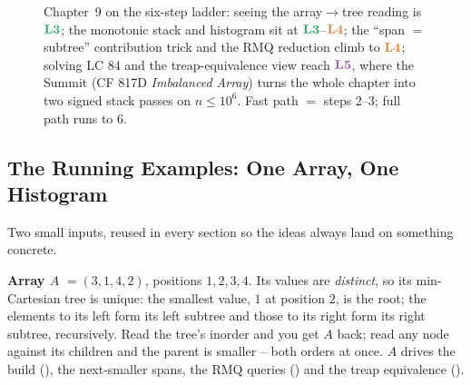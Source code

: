 \begin{figure}[H]
\centering
{}
\caption*{Chapter~9 on the six-step ladder: seeing the array$\to$tree reading is $\lv3$; the monotonic
stack and histogram sit at $\lv3$--$\lv4$; the ``span $=$ subtree'' contribution trick and the RMQ
reduction climb to $\lv4$; solving LC 84 and the treap-equivalence view reach $\lv5$, where the Summit
(CF 817D \emph{Imbalanced Array}) turns the whole chapter into two signed stack passes on $n\le 10^6$.
Fast path $=$ steps 2--3; full path runs to 6.}
\end{figure}

\subsection*{The Running Examples: One Array, One Histogram}

Two small inputs, reused in every section so the ideas always land on something concrete.

\textbf{Array $A$} $= (3, 1, 4, 2)$, positions $1,2,3,4$. Its values are \emph{distinct}, so its
min-Cartesian tree is unique: the smallest value, $1$ at position $2$, is the root; the elements to
its left form its left subtree and those to its right form its right subtree, recursively. Read the
tree's inorder and you get $A$ back; read any node against its children and the parent is smaller --
both orders at once. $A$ drives the build (), the next-smaller spans, the RMQ
queries () and the treap equivalence ().


